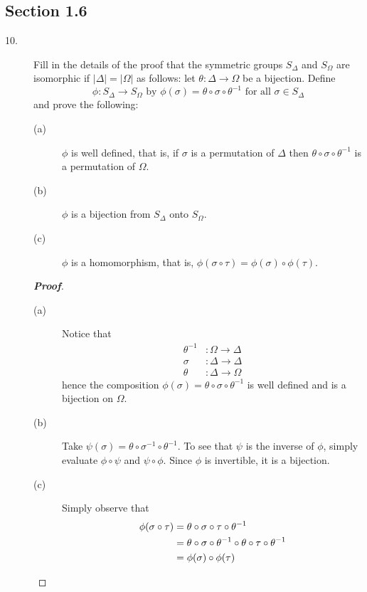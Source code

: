 \documentclass[12pt,leqno]{book}
\theoremstyle{definition}
\newenvironment{Proof}{\begin{proof}[\textnormal{\textbf{Proof}}]}{\end{proof}}
\begin{document}
\begin{description}
\section*{Section 1.6}
  \begin{description}
   \item [10.] Fill in the details of the proof that the symmetric groups $S_{\Delta}$ and $S_{\Omega}$ are isomorphic if $|\Delta|=|\Omega|$ as follows: let $\theta:\Delta\to\Omega$ be a bijection. Define\[\phi:S_{\Delta}\to S_{\Omega}\text{ by }\phi(\sigma)=\theta\circ\sigma\circ\theta^{-1}\text{ for all }\sigma\in S_{\Delta}\]and prove the following:
  \begin{description}
   \item [(a)] $\phi$ is well defined, that is, if $\sigma$ is a permutation of $\Delta$ then $\theta\circ\sigma\circ\theta^{-1}$ is a permutation of $\Omega$.
   \item [(b)] $\phi$ is a bijection from $S_{\Delta}$ onto $S_{\Omega}$. 
   \item [(c)] $\phi$ is a homomorphism, that is, $\phi(\sigma\circ\tau)=\phi(\sigma)\circ\phi(\tau)$.
  \end{description}
  \begin{Proof}
   \begin{description}
    \item [(a)] Notice that \begin{align*}\theta^{-1}&:\Omega\to\Delta\\\sigma&:\Delta\to\Delta\\\theta&:\Delta\to\Omega\end{align*} hence the composition $\phi(\sigma)=\theta\circ\sigma\circ\theta^{-1}$ is well defined and is a bijection on $\Omega$.
    \item [(b)] Take $\psi(\sigma)=\theta\circ\sigma^{-1}\circ\theta^{-1}$. To see that $\psi$ is the inverse of $\phi$, simply evaluate $\phi\circ\psi$ and $\psi\circ\phi$. Since $\phi$ is invertible, it is a bijection.
    \item [(c)] Simply observe that \begin{align*}\phi(\sigma\circ\tau)&=\theta\circ\sigma\circ\tau\circ\theta^{-1}\\&=\theta\circ\sigma\circ\theta^{-1}\circ\theta\circ\tau\circ\theta^{-1}\\&=\phi(\sigma)\circ\phi(\tau)\qedhere\end{align*}
   \end{description}
  \end{Proof}


\end{description}
\end{description}
\end{document}

